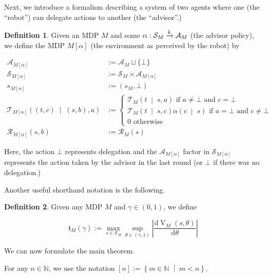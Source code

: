 \documentclass[11pt]{article}
\theoremstyle{definition}
\newtheorem{definition}{Definition}%
\theoremstyle{plain}
\newcommand{\AP}[1]{\left(#1\right)}
\newcommand{\APM}[2]{\left(#1\;\middle\vert\;#2\right)}
\newcommand{\ACM}[2]{\left\{#1\;\middle\vert\;#2\right\}}
\newcommand{\D}{\mathrm{d}}
\newcommand{\Nats}{\mathbb{N}}
\newcommand{\Abs}[1]{\left\vert #1 \right\vert}
\newcommand{\K}{\xrightarrow{\textnormal{k}}}
\newcommand{\A}{\mathcal{A}}
\newcommand{\St}{\mathcal{S}}
\newcommand{\T}{\mathcal{T}}
\newcommand{\R}{\mathcal{R}}
\newcommand{\V}{\operatorname{V}}
\newcommand{\Tn}{\mathfrak{t}}
\newcommand{\Ad}{\alpha}
\begin{document}
Next, we introduce a formalism describing a system of two agents where one (the \enquote{robot}) can delegate actions to another (the \enquote{advisor}.)

\begin{samepage}
\begin{definition}

Given an MDP $M$ and some $\Ad: \St_M \K \A_M$ (the advisor policy), we define the MDP $M[\Ad]$ (the environment as perceived by the robot) by

\begin{align}
\A_{M[\Ad]}&:=\A_M \sqcup \{\bot\} \\
\St_{M[\Ad]}&:=\St_M \times \A_{M[\Ad]} \\ 
s_{M[\Ad]}&:=\AP{s_M,\bot} \\
\T_{M[\Ad]}\APM{\AP{t,c}}{\AP{s,b},a}&:=\begin{cases} \T_M\APM{t}{s,a} \text{ if } a\ne\bot \text{ and } c=\bot \\ \T_M\APM{t}{s,c}\Ad\APM{c}{s} \text{ if } a = \bot \text{ and } c\ne\bot \\ 0 \text{ otherwise} \end{cases} \\
\R_{M[\Ad]}(s,b)&:= \R_M(s)
\end{align}

Here, the action $\bot$ represents delegation and the $\A_{M[\Ad]}$ factor in $\St_{M[\Ad]}$ represents the action taken by the advisor in the last round (or $\bot$ if there was no delegation.)

\end{definition}
\end{samepage}

Another useful shorthand notation is the following.

\begin{samepage}
\begin{definition}

Given any MDP $M$ and $\gamma\in(0,1)$, we define

\begin{equation}
\Tn_{M}(\gamma):=\max_{s \in \St_M} \sup_{\theta\in(\gamma,1)} \Abs{\frac{\D{\V_{M}(s,\theta)}}{\D{\theta}}}
\end{equation}

\end{definition}
\end{samepage}

We can now formulate the main theorem.

For any $n \in \Nats$, we use the notation $[n]:=\ACM{m\in\Nats}{m < n}.$
\end{document}
